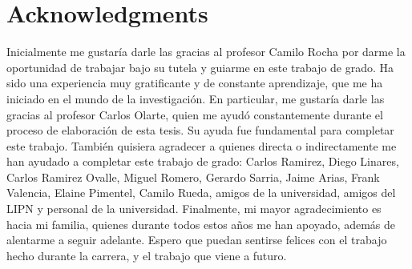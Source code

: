 \chapter*{Acknowledgments}
Inicialmente me gustaría darle las gracias al profesor Camilo Rocha por darme la oportunidad de trabajar bajo su tutela y guiarme en este trabajo de grado. Ha sido una experiencia muy gratificante y de constante aprendizaje, que me ha iniciado en el mundo de la investigación. En particular, me gustaría darle las gracias al profesor Carlos Olarte, quien me ayudó constantemente durante el proceso de elaboración de esta tesis. Su ayuda fue fundamental para completar este trabajo. También quisiera agradecer a quienes directa o indirectamente me han ayudado a completar este trabajo de grado: Carlos Ramirez, Diego Linares, Carlos Ramirez Ovalle, Miguel Romero, Gerardo Sarria, Jaime Arias, Frank Valencia, Elaine Pimentel, Camilo Rueda, amigos de la universidad, amigos del LIPN y  personal de la universidad. Finalmente, mi mayor agradecimiento es hacia mi familia, quienes durante todos estos años me han apoyado, además de alentarme a seguir adelante. Espero que puedan sentirse felices con el trabajo hecho durante la carrera, y el trabajo que viene a futuro.




